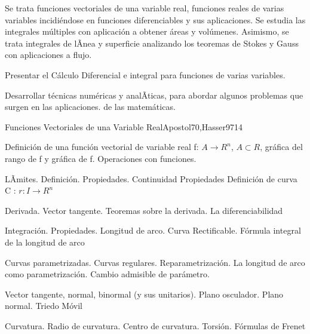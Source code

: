 \begin{syllabus}


\begin{justification}
Se trata funciones vectoriales de una variable real, funciones reales de varias variables incidiéndose en funciones diferenciables y sus aplicaciones. Se estudia las integrales múltiples con aplicación a obtener áreas y volúmenes.
Asimismo, se trata integrales de lÃ­nea y superficie analizando los teoremas de Stokes y Gauss con aplicaciones a flujo.
\end{justification}

\begin{goals}
\item  Presentar el Cálculo Diferencial e integral para funciones de varias variables.
\item  Desarrollar técnicas numéricas y analÃ­ticas, para abordar algunos problemas que surgen en las aplicaciones. de las matemáticas.
\end{goals}

\begin{outcomes}
\end{outcomes}

\begin{unit}{Funciones Vectoriales de una Variable Real}{Apostol70,Hasser97}{14}
   \begin{topics}
	\item  Definición de una función vectorial de variable real f: $A \rightarrow R^n$, $A \subset R$, gráfica del rango de f y gráfica de f. Operaciones con funciones.
	\item LÃ­mites. Definición. Propiedades. Continuidad  Propiedades Definición de curva C : $r : I \rightarrow R^n$
	\item  Derivada. Vector tangente. Teoremas sobre la derivada. La diferenciabilidad
	\item  Integración. Propiedades. Longitud de arco. Curva Rectificable. Fórmula integral de la longitud de arco
	\item  Curvas parametrizadas. Curvas regulares. Reparametrización. La longitud de arco como parametrización. Cambio admisible de parámetro.
	\item  Vector tangente, normal, binormal (y sus unitarios). Plano osculador. Plano normal. Triedo Móvil
	\item Curvatura. Radio de curvatura.  Centro de curvatura. Torsión. Fórmulas de Frenet
   \end{topics}


\end{unit}
\end{syllabus}
